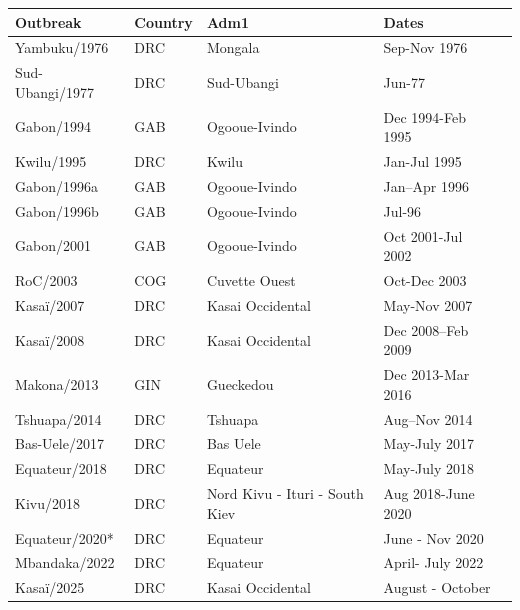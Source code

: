 
    \begin{tabular}{lllll}
Outbreak & Country  & Adm1  & Dates \\
\toprule
Yambuku/1976 & DRC & Mongala & Sep-Nov 1976 \\
Sud-Ubangi/1977 & DRC & Sud-Ubangi  & Jun-77 \\
Gabon/1994 & GAB & Ogooue-Ivindo & Dec 1994-Feb 1995 \\
Kwilu/1995 & DRC & Kwilu  & Jan-Jul 1995 \\
Gabon/1996a & GAB & Ogooue-Ivindo& Jan–Apr 1996 \\
Gabon/1996b & GAB & Ogooue-Ivindo  & Jul-96 \\
Gabon/2001 & GAB & Ogooue-Ivindo  & Oct 2001-Jul 2002 \\
RoC/2003 & COG & Cuvette Ouest  & Oct-Dec 2003 \\
Kasaï/2007 & DRC & Kasai Occidental  & May-Nov 2007 \\
Kasaï/2008 & DRC & Kasai Occidental & Dec 2008–Feb 2009 \\
Makona/2013 & GIN & Gueckedou  & Dec 2013-Mar 2016 \\
Tshuapa/2014 & DRC & Tshuapa  & Aug–Nov 2014 \\
Bas-Uele/2017 & DRC & Bas Uele  & May-July 2017 \\
Equateur/2018 & DRC & Equateur & May-July 2018 \\
Kivu/2018 & DRC & Nord Kivu - Ituri - South Kiev & Aug 2018-June 2020 \\
Equateur/2020* & DRC & Equateur & June - Nov  2020 \\
Mbandaka/2022 & DRC & Equateur  & April- July 2022 \\
Kasaï/2025 & DRC & Kasai Occidental & August - October \\
\bottomrule
\end{tabular}